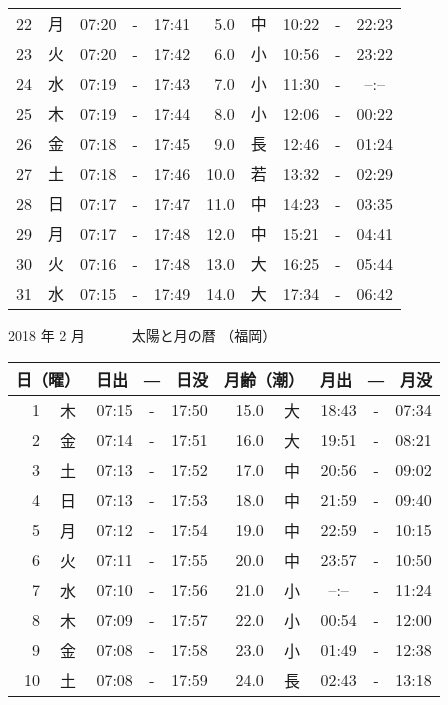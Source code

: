 \documentclass[a4j,10pt]{jsarticle}
\begin{document}
\begin{center}
\begin{table}[ht]
\begin{center}
\begin{tabular}{|rc|ccc|rc|ccc|}
 22 & 月 & 07:20 &-& 17:41 &  5.0 & 中 & 10:22 &-& 22:23 \\
 23 & 火 & 07:20 &-& 17:42 &  6.0 & 小 & 10:56 &-& 23:22 \\
 24 & 水 & 07:19 &-& 17:43 &  7.0 & 小 & 11:30 &-&  --:--  \\
 25 & 木 & 07:19 &-& 17:44 &  8.0 & 小 & 12:06 &-& 00:22 \\
 26 & 金 & 07:18 &-& 17:45 &  9.0 & 長 & 12:46 &-& 01:24 \\
 27 & 土 & 07:18 &-& 17:46 & 10.0 & 若 & 13:32 &-& 02:29 \\
 28 & 日 & 07:17 &-& 17:47 & 11.0 & 中 & 14:23 &-& 03:35 \\
 29 & 月 & 07:17 &-& 17:48 & 12.0 & 中 & 15:21 &-& 04:41 \\
 30 & 火 & 07:16 &-& 17:48 & 13.0 & 大 & 16:25 &-& 05:44 \\
 31 & 水 & 07:15 &-& 17:49 & 14.0 & 大 & 17:34 &-& 06:42 \\
    \hline
    \end{tabular}
    \end{center}
\end{table}
\newpage
  {\large 2018 年  2 月}
  {\Large 　　　太陽と月の暦   （福岡） }
  \begin{table}[ht]
  \begin{center}
     \begin{tabular}{|rc|ccc|rc|ccc|}
     \hline
     \multicolumn{2}{|c|}{日（曜）} & \multicolumn{3}{c|}{日出　―　日没} & \multicolumn{2}{c|}{月齢（潮）} & \multicolumn{3}{c|}{月出　―　月没}\\
     \hline
  1 & 木 & 07:15 &-& 17:50 & 15.0 & 大 & 18:43 &-& 07:34 \\
  2 & 金 & 07:14 &-& 17:51 & 16.0 & 大 & 19:51 &-& 08:21 \\
  3 & 土 & 07:13 &-& 17:52 & 17.0 & 中 & 20:56 &-& 09:02 \\
  4 & 日 & 07:13 &-& 17:53 & 18.0 & 中 & 21:59 &-& 09:40 \\
  5 & 月 & 07:12 &-& 17:54 & 19.0 & 中 & 22:59 &-& 10:15 \\
  6 & 火 & 07:11 &-& 17:55 & 20.0 & 中 & 23:57 &-& 10:50 \\
  7 & 水 & 07:10 &-& 17:56 & 21.0 & 小 &  --:--  &-& 11:24 \\
  8 & 木 & 07:09 &-& 17:57 & 22.0 & 小 & 00:54 &-& 12:00 \\
  9 & 金 & 07:08 &-& 17:58 & 23.0 & 小 & 01:49 &-& 12:38 \\
 10 & 土 & 07:08 &-& 17:59 & 24.0 & 長 & 02:43 &-& 13:18 \\

\end{tabular}
\end{center}
\end{table}
\end{center}
\end{document}
